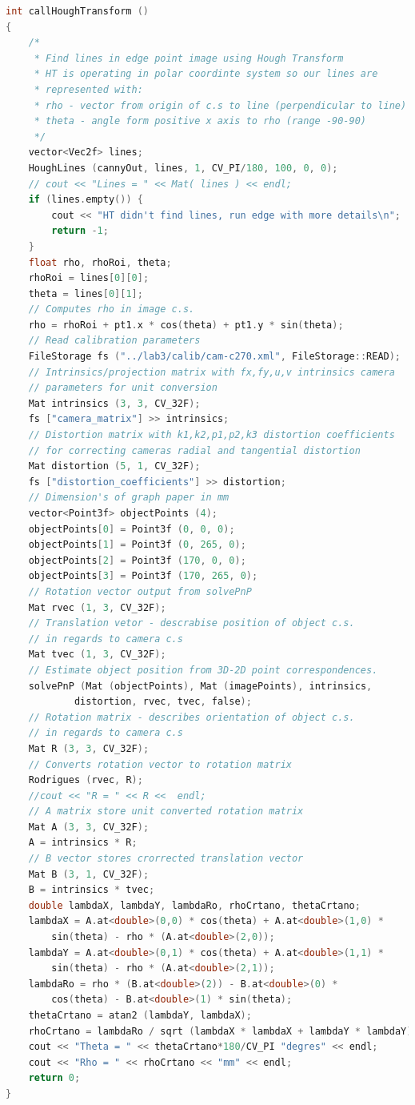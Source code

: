 \begin{lstlisting}[language=C,caption={Racunanje parametra ro i theta}]
int callHoughTransform ()
{
    /*
     * Find lines in edge point image using Hough Transform
     * HT is operating in polar coordinte system so our lines are
     * represented with: 
     * rho - vector from origin of c.s to line (perpendicular to line) 
     * theta - angle form positive x axis to rho (range -90-90)
     */
    vector<Vec2f> lines;
    HoughLines (cannyOut, lines, 1, CV_PI/180, 100, 0, 0);
    // cout << "Lines = " << Mat( lines ) << endl;
    if (lines.empty()) {
        cout << "HT didn't find lines, run edge with more details\n";
        return -1;
    }
    float rho, rhoRoi, theta;
    rhoRoi = lines[0][0];
    theta = lines[0][1];
    // Computes rho in image c.s.
    rho = rhoRoi + pt1.x * cos(theta) + pt1.y * sin(theta);
    // Read calibration parameters
    FileStorage fs ("../lab3/calib/cam-c270.xml", FileStorage::READ);
    // Intrinsics/projection matrix with fx,fy,u,v intrinsics camera
    // parameters for unit conversion
    Mat intrinsics (3, 3, CV_32F); 
    fs ["camera_matrix"] >> intrinsics; 
    // Distortion matrix with k1,k2,p1,p2,k3 distortion coefficients
    // for correcting cameras radial and tangential distortion
    Mat distortion (5, 1, CV_32F);
    fs ["distortion_coefficients"] >> distortion; 
    // Dimension's of graph paper in mm
    vector<Point3f> objectPoints (4);
    objectPoints[0] = Point3f (0, 0, 0);
    objectPoints[1] = Point3f (0, 265, 0);
    objectPoints[2] = Point3f (170, 0, 0);
    objectPoints[3] = Point3f (170, 265, 0);
    // Rotation vector output from solvePnP
    Mat rvec (1, 3, CV_32F);
    // Translation vetor - descrabise position of object c.s.     
    // in regards to camera c.s
    Mat tvec (1, 3, CV_32F);
    // Estimate object position from 3D-2D point correspondences.
    solvePnP (Mat (objectPoints), Mat (imagePoints), intrinsics,
            distortion, rvec, tvec, false);
    // Rotation matrix - describes orientation of object c.s. 
    // in regards to camera c.s
    Mat R (3, 3, CV_32F);
    // Converts rotation vector to rotation matrix
    Rodrigues (rvec, R);
    //cout << "R = " << R <<  endl;
    // A matrix store unit converted rotation matrix
    Mat A (3, 3, CV_32F);
    A = intrinsics * R; 
    // B vector stores crorrected translation vector
    Mat B (3, 1, CV_32F);
    B = intrinsics * tvec;
    double lambdaX, lambdaY, lambdaRo, rhoCrtano, thetaCrtano;
    lambdaX = A.at<double>(0,0) * cos(theta) + A.at<double>(1,0) *
        sin(theta) - rho * (A.at<double>(2,0));
    lambdaY = A.at<double>(0,1) * cos(theta) + A.at<double>(1,1) *
        sin(theta) - rho * (A.at<double>(2,1));
    lambdaRo = rho * (B.at<double>(2)) - B.at<double>(0) * 
        cos(theta) - B.at<double>(1) * sin(theta); 
    thetaCrtano = atan2 (lambdaY, lambdaX);
    rhoCrtano = lambdaRo / sqrt (lambdaX * lambdaX + lambdaY * lambdaY);
    cout << "Theta = " << thetaCrtano*180/CV_PI "degres" << endl;
    cout << "Rho = " << rhoCrtano << "mm" << endl;
    return 0;
}
\end{lstlisting}

